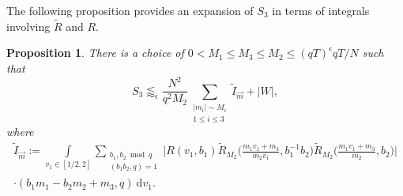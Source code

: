 \documentclass[12pt]{amsart}
\newtheorem{proposition}[theorem]{Proposition}
\theoremstyle{definition}
\theoremstyle{plain}
\theoremstyle{remark}
\numberwithin{equation}{section}
\numberwithin{theorem}{section}
\numberwithin{equation}{section}
\begin{document}
	
	The following proposition provides an expansion of $S_{3}$ in terms of integrals involving $\tilde{R}$ and $R$.
	
	\begin{proposition}\label{S3B1}
		There is a choice of $0<M_{1}\leq M_{3}\leq M_{2}\leq (qT)^{\epsilon}qT/N$ such that
		\[S_{3}\lessapprox_{\epsilon} \frac{N^{2}}{q^{2}M_{2}}\sum_{\substack{|m_{i}|\sim M_{i} \\ 1\leq i \leq 3}} \tilde{I}_{\overrightarrow{m}}+|W|,\]
		where
		\begin{align*}\tilde{I}_{\overrightarrow{m}}:=\int\limits_{ v_{1} \in [1/2, 2]}\sum_{\substack{b_1,b_2 \bmod q \\ (b_1b_2,q)=1}}\bigg| R(v_{1}, b_{1})\tilde{R}_{M_{2}}\bigg(\frac{m_{1}v_{1}+m_{3}}{m_{2}v_{1}}, b_{1}^{-1}b_{2}\bigg)\tilde{R}_{M_{2}}\bigg(\frac{m_{1}v_{1}+m_{3}}{m_{2}}, b_{2}\bigg)\bigg|
			\\
			\cdot(b_{1}m_{1}-b_{2}m_{2}+m_{3},q)\:\mathrm{d}v_{1}.
		\end{align*}
	\end{proposition}
\end{document}
